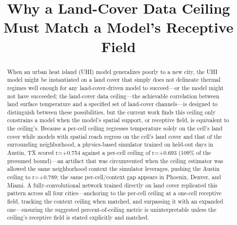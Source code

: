 \usepackage{cite}
\usepackage{amsmath,amssymb,amsfonts}
\usepackage{algorithmic}
\usepackage{graphicx}
\usepackage{textcomp}
\usepackage{xcolor}
\def\BibTeX{{\rm B\kern-.05em{\sc i\kern-.025em b}\kern-.08em
    T\kern-.1667em\lower.7ex\hbox{E}\kern-.125emX}}
\usepackage{booktabs}
\usepackage{url}



\title{Why a Land-Cover Data Ceiling Must Match a Model's Receptive Field}

\author{
}

\maketitle

\begin{abstract}
When an urban heat island (UHI) model generalizes poorly to a new city, the UHI model might be instantiated on a land cover that simply does not delineate thermal regimes well enough for any land-cover-driven model to succeed---or the model might not have succeeded; the land-cover data ceiling---the achievable correlation between land surface temperature and a specified set of land-cover channels---is designed to distinguish between these possibilities, but the current work finds this ceiling only constrains a model when the model's spatial support, or receptive field, is equivalent to the ceiling's. Because a per-cell ceiling regresses temperature solely on the cell's land cover while models with spatial reach regress on the cell's land cover and that of the surrounding neighborhood, a physics-based simulator trained on held-out days in Austin, TX scored r=+0.754 against a per-cell ceiling of r=+0.693 (109\% of the presumed bound)---an artifact that was circumvented when the ceiling estimator was allowed the same neighborhood context the simulator leverages, pushing the Austin ceiling to r=+0.789; the same per-cell/context gap appears in Phoenix, Denver, and Miami. A fully-convolutional network trained directly on land cover replicated this pattern across all four cities---anchoring to the per-cell ceiling at a one-cell receptive field, tracking the context ceiling when matched, and surpassing it with an expanded one---ensuring the suggested percent-of-ceiling metric is uninterpretable unless the ceiling's receptive field is stated explicitly and matched.
\end{abstract}

